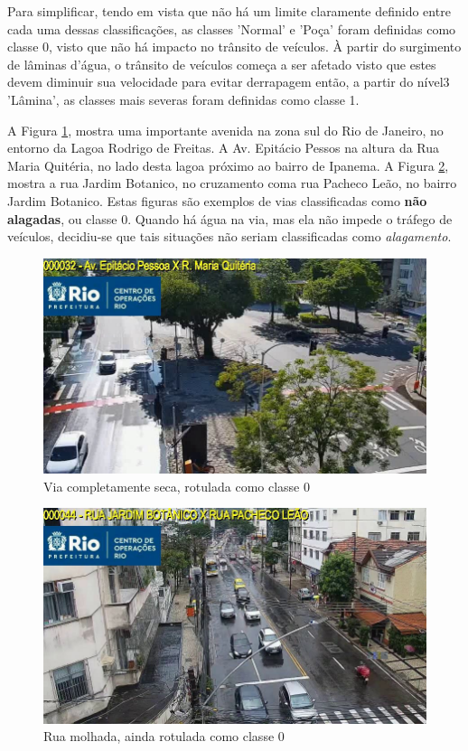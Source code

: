 Para simplificar, tendo em vista que não há um limite claramente definido entre cada uma dessas classificações, as classes 'Normal' e 'Poça' foram definidas como classe 0, 
visto que não há impacto no trânsito de veículos. À partir do surgimento de lâminas d'água, 
o trânsito de veículos começa a ser afetado visto que estes devem diminuir sua velocidade para evitar derrapagem \cite{michelinaquaplaning} então, a partir do nível3 'Lâmina', 
as classes mais severas foram definidas como classe 1.

A Figura \ref{fig:class0_1}, mostra uma importante avenida na zona sul do Rio de Janeiro, no entorno da Lagoa Rodrigo de Freitas. 
A Av. Epitácio Pessos na altura da Rua Maria Quitéria, no lado desta lagoa próximo ao bairro de Ipanema. 
A Figura \ref{fig:class0_2}, mostra a rua Jardim Botanico, no cruzamento coma rua Pacheco Leão, no bairro Jardim Botanico.
Estas figuras são exemplos de vias classificadas como \textbf{não alagadas}, ou classe 0. 
Quando há água na via, mas ela não impede o tráfego de veículos, decidiu-se que tais situações não seriam classificadas como \textit{alagamento}.

\begin{figure}[htb]
\centerline{\includegraphics[width=0.8\linewidth]{images/0/CODE32 2023-02-22 08-15-04-6.jpg}}
\caption{Via completamente seca, rotulada como classe 0}
\label{fig:class0_1}
\end{figure}

\begin{figure}[htb]
\centerline{\includegraphics[width=0.8\linewidth]{images/0/CODE44 2023-08-20 13-30-31-6.jpg}}
\caption{Rua molhada, ainda rotulada como classe 0}
\label{fig:class0_2}
\end{figure}

